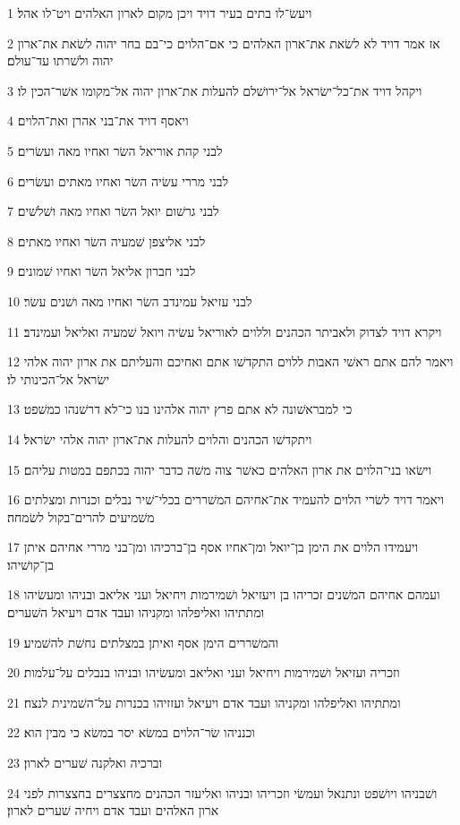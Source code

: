 \par 1 ויעשׂ־לו בתים בעיר דויד ויכן מקום לארון האלהים ויט־לו אהל׃
\par 2 אז אמר דויד לא לשׂאת את־ארון האלהים כי אם־הלוים כי־בם בחר יהוה לשׂאת את־ארון יהוה ולשׁרתו עד־עולם׃
\par 3 ויקהל דויד את־כל־ישׂראל אל־ירושׁלם להעלות את־ארון יהוה אל־מקומו אשׁר־הכין לו׃
\par 4 ויאסף דויד את־בני אהרן ואת־הלוים׃
\par 5 לבני קהת אוריאל השׂר ואחיו מאה ועשׂרים׃
\par 6 לבני מררי עשׂיה השׂר ואחיו מאתים ועשׂרים׃
\par 7 לבני גרשׁום יואל השׂר ואחיו מאה ושׁלשׁים׃
\par 8 לבני אליצפן שׁמעיה השׂר ואחיו מאתים׃
\par 9 לבני חברון אליאל השׂר ואחיו שׁמונים׃
\par 10 לבני עזיאל עמינדב השׂר ואחיו מאה ושׁנים עשׂר׃
\par 11 ויקרא דויד לצדוק ולאביתר הכהנים וללוים לאוריאל עשׂיה ויואל שׁמעיה ואליאל ועמינדב׃
\par 12 ויאמר להם אתם ראשׁי האבות ללוים התקדשׁו אתם ואחיכם והעליתם את ארון יהוה אלהי ישׂראל אל־הכינותי לו׃
\par 13 כי למבראשׁונה לא אתם פרץ יהוה אלהינו בנו כי־לא דרשׁנהו כמשׁפט׃
\par 14 ויתקדשׁו הכהנים והלוים להעלות את־ארון יהוה אלהי ישׂראל׃
\par 15 וישׂאו בני־הלוים את ארון האלהים כאשׁר צוה משׁה כדבר יהוה בכתפם במטות עליהם׃
\par 16 ויאמר דויד לשׂרי הלוים להעמיד את־אחיהם המשׁררים בכלי־שׁיר נבלים וכנרות ומצלתים משׁמיעים להרים־בקול לשׂמחה׃
\par 17 ויעמידו הלוים את הימן בן־יואל ומן־אחיו אסף בן־ברכיהו ומן־בני מררי אחיהם איתן בן־קושׁיהו׃
\par 18 ועמהם אחיהם המשׁנים זכריהו בן ויעזיאל ושׁמירמות ויחיאל ועני אליאב ובניהו ומעשׂיהו ומתתיהו ואליפלהו ומקניהו ועבד אדם ויעיאל השׁערים׃
\par 19 והמשׁררים הימן אסף ואיתן במצלתים נחשׁת להשׁמיע׃
\par 20 וזכריה ועזיאל ושׁמירמות ויחיאל ועני ואליאב ומעשׂיהו ובניהו בנבלים על־עלמות׃
\par 21 ומתתיהו ואליפלהו ומקניהו ועבד אדם ויעיאל ועזזיהו בכנרות על־השׁמינית לנצח׃
\par 22 וכנניהו שׂר־הלוים במשׂא יסר במשׂא כי מבין הוא׃
\par 23 וברכיה ואלקנה שׁערים לארון׃
\par 24 ושׁבניהו ויושׁפט ונתנאל ועמשׂי וזכריהו ובניהו ואליעזר הכהנים מחצצרים בחצצרות לפני ארון האלהים ועבד אדם ויחיה שׁערים לארון׃
